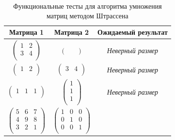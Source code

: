 \begin{table}[h!]
    \caption{Функциональные тесты для алгоритма умножения матриц методом Штрассена}
    \label{tbl:func_test_strassen}
    \centering
        \begin{tabular}{||c|c|c||} 
        \hline
        Матрица 1& Матрица 2& Ожидаемый результат \\
        \hline\hline
        $\begin{pmatrix}
            1 & 2\\
            3 & 4\\
        \end{pmatrix}$ 
        &  
        $\begin{pmatrix}
            &
        \end{pmatrix}$
        &
        \textit{Неверный размер} \\
        \hline
        $\begin{pmatrix}
            1 & 2\\
        \end{pmatrix}$ 
        &  
        $\begin{pmatrix}
            3 & 4\\
        \end{pmatrix}$
        &
        \textit{Неверный размер} \\
        \hline
        $\begin{pmatrix}
            1 & 1 & 1\\
        \end{pmatrix}$ 
        &  
        $\begin{pmatrix}
            1\\
            1\\
            1\\
        \end{pmatrix}$
        &
        \textit{Неверный размер} \\
        \hline
        $\begin{pmatrix}
            5 & 6 & 7\\
            4 & 9 & 8\\
            3 & 2 & 1\\
        \end{pmatrix}$ 
        &  
        $\begin{pmatrix}
            1 & 0 & 0\\
            0 & 1 & 0\\
            0 & 0 & 1\\
        \end{pmatrix}$

\end{tabular}
\end{table}
